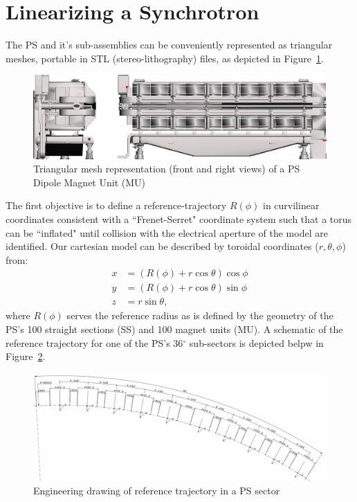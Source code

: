 \section{Linearizing a Synchrotron}

The PS and it's sub-assemblies can be conveniently represented as triangular meshes, portable in STL (stereo-lithography) files, as depicted in Figure~\ref{fig:ps_mu}.
\begin{figure}
    \centering
    \includegraphics{figs/ps_magnet.png}
    \caption{Triangular mesh representation (front and right views) of a PS Dipole Magnet Unit (MU)}
    \label{fig:ps_mu}
\end{figure}

The first objective is to define a reference-trajectory $R(\phi)$ in curvilinear coordinates consistent with a ``Frenet-Serret" coordinate system  such that a torus can be ``inflated" until collision with the electrical aperture of the model are identified. Our cartesian model can be described by toroidal coordinates ($r,\theta,\phi$) from:
$$\begin{aligned}
        x & = (R(\phi)+r\cos\theta)\cos\phi \\
        y & = (R(\phi)+r\cos\theta)\sin\phi \\
        z & = r\sin\theta,
    \end{aligned}$$
where $R(\phi)$ serves the reference radius as is defined by the geometry of the PS's 100 straight sections (SS) and 100 magnet units (MU). A schematic of the reference trajectory for one of the PS's 36$^\circ$ sub-sectors is depicted belpw in Figure~\ref{fig:ref_traj}.
\begin{figure}
    \centering
    \includegraphics{figs/reference_trajectory_path.jpg}
    \caption{Engineering drawing of reference trajectory in a PS sector}
    \label{fig:ref_traj}
\end{figure}

